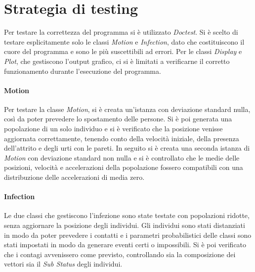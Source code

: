\documentclass[a4paper,10pt,twocolumn]{article}
\begin{document}
\section{Strategia di testing}
Per testare la correttezza del programma si è utilizzato \emph{Doctest}. Si è scelto di testare esplicitamente solo le classi \emph{Motion} e \emph{Infection}, dato che costituiscono il cuore del programma e sono le più suscettibili ad errori. Per le classi \emph{Display} e \emph{Plot}, che gestiscono l'output grafico, ci si è limitati a verificarne il corretto funzionamento durante l'esecuzione del programma.

\paragraph{Motion}
Per testare la classe \emph{Motion}, si è creata un'istanza con deviazione standard nulla, così da poter prevedere lo spostamento delle persone. Si è poi generata una popolazione di un solo individuo e si è verificato che la posizione venisse aggiornata correttamente, tenendo conto della velocità iniziale, della presenza dell'attrito e degli urti con le pareti. In seguito si è creata una seconda istanza di \emph{Motion} con deviazione standard non nulla e si è controllato che le medie delle posizioni, velocità e accelerazioni della popolazione fossero compatibili con una distribuzione delle accelerazioni di media zero.

\paragraph{Infection}
Le due classi che gestiscono l'infezione sono state testate con popolazioni ridotte, senza aggiornare la posizione degli individui. Gli individui sono stati distanziati in modo da poter prevedere i contatti e i parametri probabilistici delle classi sono stati impostati in modo da generare eventi certi o impossibili. Si è poi verificato che i contagi avvenissero come previsto, controllando sia la composizione dei vettori sia il \emph{Sub Status} degli individui.
\end{document}

